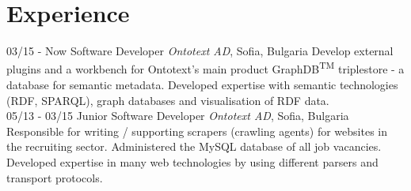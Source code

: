 \documentclass[]{friggeri-cv}
\begin{document}
\section{Experience}
\begin{entrylist}
  \entry
    {03/15 - Now}
    {Software Developer}
    {\textit{Ontotext AD}, Sofia, Bulgaria}
    {Develop external plugins and a workbench for Ontotext's main product GraphDB\textsuperscript{TM} triplestore - a database for semantic metadata. Developed expertise with semantic technologies (RDF, SPARQL), graph databases and visualisation of RDF data.\\}
   \entry
    {05/13 - 03/15}
    {Junior Software Developer}
    {\textit{Ontotext AD}, Sofia, Bulgaria}
    {Responsible for writing / supporting scrapers (crawling agents) for websites in the recruiting sector. Administered the MySQL database of all job vacancies. Developed expertise in many web technologies by using different parsers and transport protocols. }
\end{entrylist}
\end{document}
